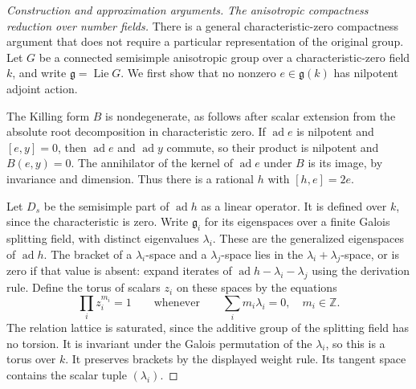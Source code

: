 \documentclass[11pt,a4paper,openany,oneside]{book}
\theoremstyle{resultstyle}
\theoremstyle{definition}
\numberwithin{equation}{chapter}
\begin{document}
\begin{proof}[Construction and approximation arguments]
\medskip\noindent
\textit{The anisotropic compactness reduction over number fields.}
There is a general characteristic-zero compactness argument
that does not require a particular representation of the
original group. Let \(G\) be a connected semisimple
anisotropic group over a characteristic-zero field \(k\),
and write \(\mathfrak g=\operatorname{Lie}G\).
We first show that no nonzero \(e\in\mathfrak g(k)\) has
nilpotent adjoint action.

The Killing form \(B\) is nondegenerate, as follows
after scalar extension from the absolute root
decomposition in characteristic zero. If
\(\operatorname{ad}e\) is nilpotent and \([e,y]=0\),
then \(\operatorname{ad}e\) and \(\operatorname{ad}y\)
commute, so their product is nilpotent and
\(B(e,y)=0\). The annihilator of the kernel of
\(\operatorname{ad}e\) under \(B\) is its image,
by invariance and dimension. Thus there is a
rational \(h\) with \([h,e]=2e\).

Let \(D_s\) be the semisimple part of
\(\operatorname{ad}h\) as a linear operator.
It is defined over \(k\), since the characteristic
is zero. Write \(\mathfrak g_i\) for its
eigenspaces over a finite Galois splitting field,
with distinct eigenvalues \(\lambda_i\).
These are the generalized eigenspaces of
\(\operatorname{ad}h\). The bracket of a
\(\lambda_i\)-space and a \(\lambda_j\)-space lies
in the \(\lambda_i+\lambda_j\)-space, or is zero
if that value is absent: expand iterates of
\(\operatorname{ad}h-\lambda_i-\lambda_j\)
using the derivation rule. Define the torus of
scalars \(z_i\) on these spaces by the equations
\[
 \prod_i z_i^{m_i}=1
 \qquad\text{whenever}\qquad
 \sum_i m_i\lambda_i=0,\quad m_i\in\mathbb Z.
\]
The relation lattice is saturated, since the
additive group of the splitting field has no
torsion. It is invariant under the Galois
permutation of the \(\lambda_i\), so this is a
torus over \(k\). It preserves brackets by the
displayed weight rule. Its tangent space contains
the scalar tuple \((\lambda_i)\).


\end{proof}
\end{document}
